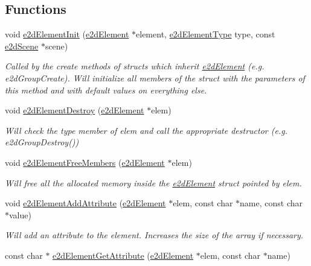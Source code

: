 \subsection*{Functions}
\begin{DoxyCompactItemize}
\item 
void \hyperlink{group__e2d_element_ga8734d10ef40a380dfc51bfe1790a92a7}{e2d\-Element\-Init} (\hyperlink{structe2d_element}{e2d\-Element} $\ast$element, \hyperlink{group__e2d_element_ga9bc8cfdec08c7e9069fc707ee456fd38}{e2d\-Element\-Type} type, const \hyperlink{structe2d_scene}{e2d\-Scene} $\ast$scene)
\begin{DoxyCompactList}\small\item\em Called by the create methods of structs which inherit \hyperlink{structe2d_element}{e2d\-Element} (e.\-g. e2d\-Group\-Create). Will initialize all members of the struct with the parameters of this method and with default values on everything else. \end{DoxyCompactList}\item 
void \hyperlink{group__e2d_element_ga214c437a16fe6f3fc795539f851a2019}{e2d\-Element\-Destroy} (\hyperlink{structe2d_element}{e2d\-Element} $\ast$elem)
\begin{DoxyCompactList}\small\item\em Will check the type member of elem and call the appropriate destructor (e.\-g. e2d\-Group\-Destroy()) \end{DoxyCompactList}\item 
void \hyperlink{group__e2d_element_gae8da5104d70a09549ca74044dda8313c}{e2d\-Element\-Free\-Members} (\hyperlink{structe2d_element}{e2d\-Element} $\ast$elem)
\begin{DoxyCompactList}\small\item\em Will free all the allocated memory inside the \hyperlink{structe2d_element}{e2d\-Element} struct pointed by elem. \end{DoxyCompactList}\item 
void \hyperlink{group__e2d_element_ga5cfa0a343d3dd1a30b0addc4ec6e7f88}{e2d\-Element\-Add\-Attribute} (\hyperlink{structe2d_element}{e2d\-Element} $\ast$elem, const char $\ast$name, const char $\ast$value)
\begin{DoxyCompactList}\small\item\em Will add an attribute to the element. Increases the size of the array if necessary. \end{DoxyCompactList}\item 
const char $\ast$ \hyperlink{group__e2d_element_gac32ea8a33b317fc014929102d64ac157}{e2d\-Element\-Get\-Attribute} (\hyperlink{structe2d_element}{e2d\-Element} $\ast$elem, const char $\ast$name)

\end{DoxyCompactItemize}
